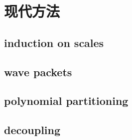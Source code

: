 \section{现代方法}
\label{b2:sec:2505}


\subsection{induction on scales}
\label{b2:subsec:250501}

\subsection{wave packets}
\label{b2:subsec:250502}

\subsection{polynomial partitioning}
\label{b2:subsec:250503}

\subsection{decoupling}
\label{b2:subsec:250504}


